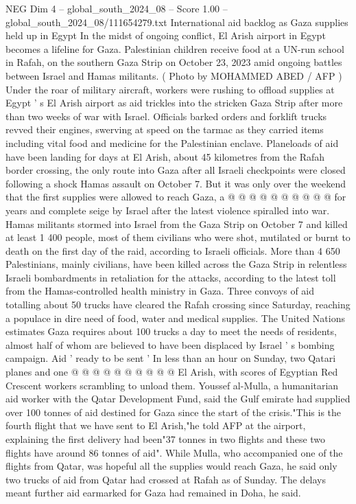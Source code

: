 \begin{textsample}{NEG Dim 4 – global\_south\_2024\_08 – Score 1.00 – global\_south\_2024\_08/111654279.txt}  \label{ex:f4_neg_338}
International aid backlog as Gaza supplies held up in Egypt In the midst of ongoing conflict, El Arish airport in Egypt becomes a lifeline for Gaza.
Palestinian children receive food at a UN-run school in Rafah, on the southern Gaza Strip on October 23, 2023 amid ongoing battles between Israel and Hamas militants. ( Photo by MOHAMMED ABED / AFP ) Under the roar of military aircraft, workers were rushing to offload supplies at Egypt ' s El Arish airport as aid trickles into the stricken Gaza Strip after more than two weeks of war with Israel.
Officials barked orders and forklift trucks revved their engines, swerving at speed on the tarmac as they carried items including vital food and medicine for the Palestinian enclave.
Planeloads of aid have been landing for days at El Arish, about 45 kilometres from the Rafah border crossing, the only route into Gaza after all Israeli checkpoints were closed following a shock Hamas assault on October 7.
But it was only over the weekend that the first supplies were allowed to reach Gaza, a @ @ @ @ @ @ @ @ @ @ for years and complete seige by Israel after the latest violence spiralled into war.
Hamas militants stormed into Israel from the Gaza Strip on October 7 and killed at least 1 400 people, most of them civilians who were shot, mutilated or burnt to death on the first day of the raid, according to Israeli officials.
More than 4 650 Palestinians, mainly civilians, have been killed across the Gaza Strip in relentless Israeli bombardments in retaliation for the attacks, according to the latest toll from the Hamas-controlled health ministry in Gaza.
Three convoys of aid totalling about 50 trucks have cleared the Rafah crossing since Saturday, reaching a populace in dire need of food, water and medical supplies.
The United Nations estimates Gaza requires about 100 trucks a day to meet the needs of residents, almost half of whom are believed to have been displaced by Israel ' s bombing campaign.
Aid ' ready to be sent ' In less than an hour on Sunday, two Qatari planes and one @ @ @ @ @ @ @ @ @ @ El Arish, with scores of Egyptian Red Crescent workers scrambling to unload them.
Youssef al-Mulla, a humanitarian aid worker with the Qatar Development Fund, said the Gulf emirate had supplied over 100 tonnes of aid destined for Gaza since the start of the crisis."This is the fourth flight that we have sent to El Arish,"he told AFP at the airport, explaining the first delivery had been"37 tonnes in two flights and these two flights have around 86 tonnes of aid".
While Mulla, who accompanied one of the flights from Qatar, was hopeful all the supplies would reach Gaza, he said only two trucks of aid from Qatar had crossed at Rafah as of Sunday.
The delays meant further aid earmarked for Gaza had remained in Doha, he said.

\end{textsample}
